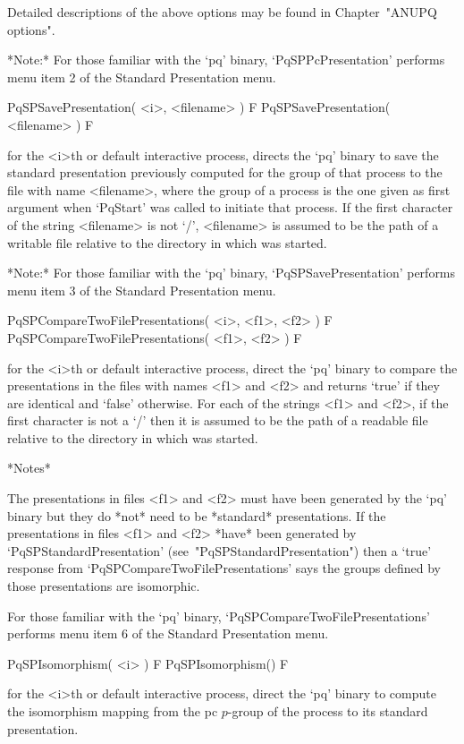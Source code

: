 Detailed descriptions of the above options may be found in Chapter~"ANUPQ
options".

*Note:* For those familiar with  the  `pq'  binary,  `PqSPPcPresentation'
performs menu item 2 of the Standard Presentation menu.

\>PqSPSavePresentation( <i>, <filename> ) F
\>PqSPSavePresentation( <filename> ) F

for the <i>th or default interactive {\ANUPQ} process, directs  the  `pq'
binary to save the standard  presentation  previously  computed  for  the
group of that process to the file with name <filename>, where  the  group
of a process is the one given as first argument when `PqStart' was called
to initiate that process. If the first character of the string <filename>
is not `/', <filename> is assumed to be  the  path  of  a  writable  file
relative to the directory in which {\GAP} was started.

*Note:* For those familiar with the `pq'  binary,  `PqSPSavePresentation'
performs menu item 3 of the Standard Presentation menu.

\>PqSPCompareTwoFilePresentations( <i>, <f1>, <f2> ) F
\>PqSPCompareTwoFilePresentations( <f1>, <f2> ) F

for the <i>th or default interactive {\ANUPQ} process, direct  the  `pq'
binary to compare the presentations in the files with names <f1> and <f2>
and returns `true' if they are identical and `false' otherwise. For  each
of the strings <f1> and <f2>, if the first character is not a `/' then it
is assumed to be the path of a readable file relative to the directory in
which {\GAP} was started.

*Notes*

The presentations in files <f1> and <f2> must have been generated by  the
`pq' binary but they do *not* need to be *standard* presentations. If the
presentations  in  files  <f1>  and   <f2>  *have*  been   generated   by
`PqSPStandardPresentation' (see~"PqSPStandardPresentation") then a `true'
response from `PqSPCompareTwoFilePresentations' says the  groups  defined
by those presentations are isomorphic.

For      those      familiar      with       the       `pq'       binary,
`PqSPCompareTwoFilePresentations' performs menu item 6  of  the  Standard
Presentation menu.

\>PqSPIsomorphism( <i> ) F
\>PqSPIsomorphism() F

for the <i>th or default interactive {\ANUPQ} process,  direct  the  `pq'
binary to compute the isomorphism mapping from the pc  $p$-group  of  the
process to its standard presentation.

